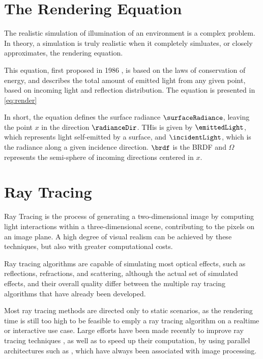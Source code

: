 \documentclass[main.tex]{subfiles}
\begin{document}
\section{The Rendering Equation}

The realistic simulation of illumination of an environment is a complex problem. In theory, a simulation is truly realistic when it completely simluates, or closely approximates, the rendering equation.

This equation, first proposed in 1986 \cite{kajiya1986rendering}, is based on the laws of conservation of energy, and describes the total amount of emitted light from any given point, based on incoming light and reflection distribution. The equation is presented in \cref{eq:render}


In short, the equation defines the surface radiance $\surfaceRadiance$, leaving the point $x$ in the direction $\radianceDir$. THis is given by $\emittedLight$, which represents light self-emitted by a surface, and $\incidentLight$, which is the radiance along a given incidence direction. $\brdf$ is the \acf{BRDF} and $\Omega$ represents the semi-sphere of incoming directions centered in $x$.


\section{Ray Tracing} \label{section:ray_tracing}

Ray Tracing is the process of generating a two-dimensional image by computing light interactions within a three-dimensional scene, contributing to the pixels on an image plane. A high degree of visual realism can be achieved by these techniques, but also with greater computational costs.

Ray tracing algorithms are capable of simulating most optical effects, such as reflections, refractions, and scattering, although the actual set of simulated effects, and their overall quality differ between the multiple ray tracing algorithms that have already been developed.

Most ray tracing methods are directed only to static scenarios, as the rendering time is still too high to be feasible to emply a ray tracing algorithm on a realtime or interactive use case.
Large efforts have been made recently to improve ray tracing techniques , as well as to speed up their computation, by using parallel architectures such as \gpus, which have always been associated with image processing.
\end{document}
